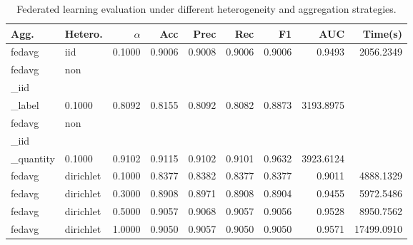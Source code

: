\begin{table}[t]
\centering
\caption{Federated learning evaluation under different heterogeneity and aggregation strategies.}\n\label{tab:phase2_federated_results}\n\begin{tabular}{l l r r r r r r r}\n\hline
Agg. & Hetero. & $\alpha$ & Acc & Prec & Rec & F1 & AUC & Time(s) \\ \hline
fedavg & iid & 0.1000 & 0.9006 & 0.9008 & 0.9006 & 0.9006 & 0.9493 & 2056.2349 \\ 
fedavg & non\\_iid\\_label & 0.1000 & 0.8092 & 0.8155 & 0.8092 & 0.8082 & 0.8873 & 3193.8975 \\ 
fedavg & non\\_iid\\_quantity & 0.1000 & 0.9102 & 0.9115 & 0.9102 & 0.9101 & 0.9632 & 3923.6124 \\ 
fedavg & dirichlet & 0.1000 & 0.8377 & 0.8382 & 0.8377 & 0.8377 & 0.9011 & 4888.1329 \\ 
fedavg & dirichlet & 0.3000 & 0.8908 & 0.8971 & 0.8908 & 0.8904 & 0.9455 & 5972.5486 \\ 
fedavg & dirichlet & 0.5000 & 0.9057 & 0.9068 & 0.9057 & 0.9056 & 0.9528 & 8950.7562 \\ 
fedavg & dirichlet & 1.0000 & 0.9050 & 0.9057 & 0.9050 & 0.9050 & 0.9571 & 17499.0910 \\ 
\hline
\end{tabular}
\end{table}

